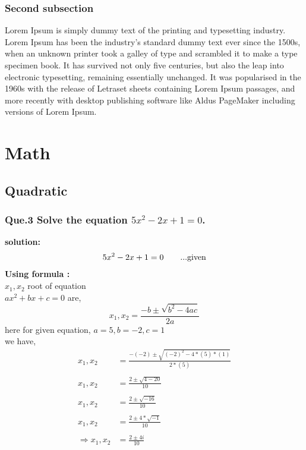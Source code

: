 \documentclass{report}
\newcommand{\eqname}[1]{\tag*{#1}}
\begin{document}
        \subsection{Second subsection}
        Lorem Ipsum is simply dummy text of the {printing and typesetting industry.}  \rm Lorem Ipsum has been the industry's standard dummy text ever since the 1500s, when an unknown printer took a galley of type and scrambled it to make a type specimen book. It has survived not only five centuries, but also the leap into electronic typesetting, remaining essentially unchanged. It was popularised in the 1960s with the release of Letraset sheets containing Lorem Ipsum passages, and more recently with desktop publishing software like Aldus PageMaker including versions of Lorem Ipsum.
    
    \chapter{Math}
    \section{Quadratic}
    \subsection{Que.3 Solve the equation $5x^2 - 2x + 1 = 0  $. }
        \normalsize
        \textbf{solution:} \\
        \begin{align*}
            5x^2-2x+1 = 0 {\eqname{...given}}
        \end{align*}
        \flushleft
        \textbf{Using formula :} \\
        $x_1,x_2$ root of equation \\
        $ax^2+bx+c=0$ are, \\
        $$ x_1,x_2 = \frac{-b \pm \sqrt{b^2 - 4ac}}{2a} $$
        { here for given equation,
        $  a = 5 , b = -2 , c = 1 $ \\ we have, } \\
        \begin{align*}
            x_1,x_2 &= \frac{-(-2) \pm \sqrt{ (-2)^2 - 4 * (5) * (1)  }}{2*(5)} \\ \\
            x_1,x_2 &=\frac{ 2 \pm \sqrt{ 4 - 20  }}{10} \\ \\
            x_1,x_2 &=\frac{ 2 \pm \sqrt{ -16  }}{10} \\ \\
            x_1,x_2 &=\frac{ 2 \pm 4*\sqrt{ -1  }}{10} \\ \\
            \Rightarrow x_1, x_2 &=\frac{ 2 \pm 4i}{10} \eqname{\bf Ans} \\ \\
        \end{align*}
    
\end{document}
